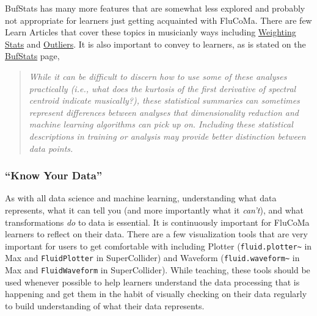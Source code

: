 \documentclass{article}
\begin{document}
BufStats has many more features that are somewhat less explored and
probably not appropriate for learners just getting acquainted with
FluCoMa. There are few Learn Articles that cover these topics in
musicianly ways including
\href{https://learn.flucoma.org/learn/weighting-stats/}{Weighting Stats}
and \href{https://learn.flucoma.org/learn/outliers/}{Outliers}. It is
also important to convey to learners, as is stated on the
\href{https://learn.flucoma.org/reference/bufstats/}{BufStats} page,

\begin{quote}
\emph{While it can be difficult to discern how to use some of these
analyses practically (i.e., what does the kurtosis of the first
derivative of spectral centroid indicate musically?), these statistical
summaries can sometimes represent differences between analyses that
dimensionality reduction and machine learning algorithms can pick up on.
Including these statistical descriptions in training or analysis may
provide better distinction between data points.}
\end{quote}

\subsubsection{``Know Your Data''}

As with all data science and machine learning, understanding what data
represents, what it can tell you (and more importantly what it
\emph{can't}), and what transformations \emph{do} to data is essential.
It is continuously important for FluCoMa learners to reflect on their
data. There are a few visualization tools that are very important for
users to get comfortable with including Plotter (\texttt{fluid.plotter\textasciitilde{}} in Max and \texttt{FluidPlotter} in SuperCollider) and Waveform
(\texttt{fluid.waveform\textasciitilde{}} in Max and
\texttt{FluidWaveform} in SuperCollider). While teaching, these tools
should be used whenever possible to help learners understand the data
processing that is happening and get them in the habit of visually
checking on their data regularly to build understanding of what their
data represents.
\end{document}
